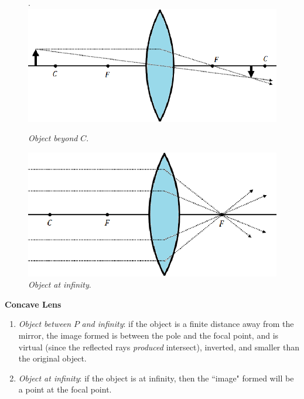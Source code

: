 \documentclass{scrartcl}
\begin{document}
    \begin{figure}[H]
        \centering
        \begin{minipage}[b]{0.49\textwidth}.
        \includegraphics[width=\textwidth]{convex5.eps}
        \caption{\textit{Object beyond} $C$.}
        \end{minipage}
        \hfill
        \begin{minipage}[b]{0.49\textwidth}
            \includegraphics[width=\textwidth]{convex6.eps}
            \caption{\textit{Object at infinity}.}
        \end{minipage}
    \end{figure}
    \quad\textbf{Concave Lens}
    \begin{enumerate}
        \item \textit{Object between} $P$ \textit{and infinity}: if the object is a finite distance away from the mirror, the image formed is between the pole and the focal point, and is virtual (since the reflected rays \textit{produced} intersect), inverted, and smaller than the original object.
        \item \textit{Object at infinity}: if the object is at infinity, then the ``image" formed will be a point at the focal point.
    \end{enumerate}
\end{document}
